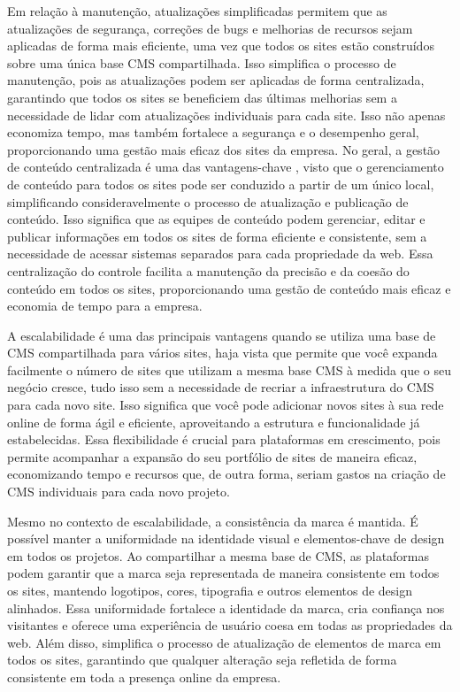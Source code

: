 \documentclass[12pt,twoside,english,brazilian]{article}
\begin{document}
Em relação à manutenção, atualizações simplificadas permitem que as atualizações de segurança, correções de bugs e melhorias de recursos sejam aplicadas de forma mais eficiente, uma vez que todos os sites estão construídos sobre uma única base CMS compartilhada. Isso simplifica o processo de manutenção, pois as atualizações podem ser aplicadas de forma centralizada, garantindo que todos os sites se beneficiem das últimas melhorias sem a necessidade de lidar com atualizações individuais para cada site. Isso não apenas economiza tempo, mas também fortalece a segurança e o desempenho geral, proporcionando uma gestão mais eficaz dos sites da empresa. No geral, a gestão de conteúdo centralizada é uma das vantagens-chave , visto que o gerenciamento de conteúdo para todos os sites pode ser conduzido a partir de um único local, simplificando consideravelmente o processo de atualização e publicação de conteúdo. Isso significa que as equipes de conteúdo podem gerenciar, editar e publicar informações em todos os sites de forma eficiente e consistente, sem a necessidade de acessar sistemas separados para cada propriedade da web. Essa centralização do controle facilita a manutenção da precisão e da coesão do conteúdo em todos os sites, proporcionando uma gestão de conteúdo mais eficaz e economia de tempo para a empresa.

A escalabilidade é uma das principais vantagens quando se utiliza uma base de CMS compartilhada para vários sites, haja vista que permite que você expanda facilmente o número de sites que utilizam a mesma base CMS à medida que o seu negócio cresce, tudo isso sem a necessidade de recriar a infraestrutura do CMS para cada novo site. Isso significa que você pode adicionar novos sites à sua rede online de forma ágil e eficiente, aproveitando a estrutura e funcionalidade já estabelecidas. Essa flexibilidade é crucial para plataformas em crescimento, pois permite acompanhar a expansão do seu portfólio de sites de maneira eficaz, economizando tempo e recursos que, de outra forma, seriam gastos na criação de CMS individuais para cada novo projeto.

Mesmo no contexto de escalabilidade, a consistência da marca é mantida. É possível manter a uniformidade na identidade visual e elementos-chave de design em todos os projetos. Ao compartilhar a mesma base de CMS, as plataformas podem garantir que a marca seja representada de maneira consistente em todos os sites, mantendo logotipos, cores, tipografia e outros elementos de design alinhados. Essa uniformidade fortalece a identidade da marca, cria confiança nos visitantes e oferece uma experiência de usuário coesa em todas as propriedades da web. Além disso, simplifica o processo de atualização de elementos de marca em todos os sites, garantindo que qualquer alteração seja refletida de forma consistente em toda a presença online da empresa.
\end{document}
